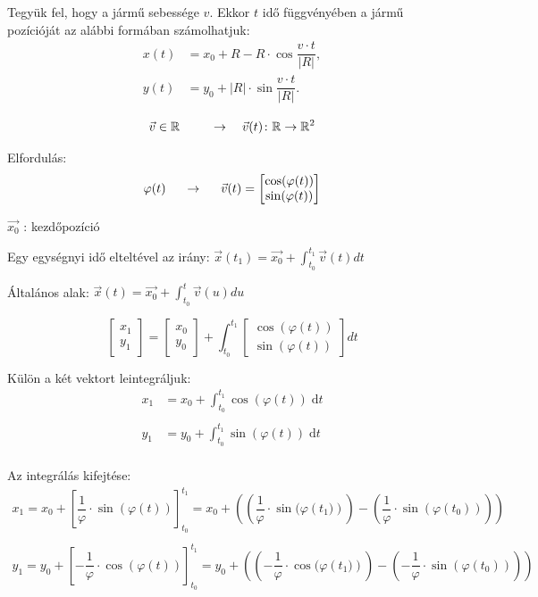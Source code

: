Tegyük fel, hogy a jármű sebessége $v$. Ekkor $t$ idő függvényében a jármű pozícióját az alábbi formában számolhatjuk:
\begin{align*}
x(t) &= x_0 + R - R \cdot \cos \dfrac{v \cdot t}{|R|}, \\
y(t) &= y_0 + |R| \cdot \sin \dfrac{v \cdot t}{|R|}.
\end{align*}


$$
\vec{v} \in \mathbb{R} \hspace{0.5cm}
\quad \rightarrow \quad
\vec{v} (t) \colon \mathbb{R} \to \mathbb{R}^2
$$

Elfordulás:
$$
\varphi (t) \hspace{0.5cm} \rightarrow \hspace{0.5cm} \vec{v} (t) =
\begin{bmatrix}
\cos(\varphi(t)) \\
\sin(\varphi(t))
\end{bmatrix}
$$

$ \vec{x_0} $ : kezdőpozíció

Egy egységnyi idő elteltével az irány: $ \vec{x} (t_1) = \vec{x_0} + \displaystyle\int_{t_0}^{t_1} \vec{v} (t) dt $

Általános alak:  $ \vec{x} (t) = \vec{x_0} + \displaystyle\int_{t_0}^{t} \vec{v} (u) du $

$$
\begin{bmatrix} x_1 \\ y_1 \end{bmatrix} = \begin{bmatrix} x_0 \\ y_0 \end{bmatrix} + \displaystyle\int_{t_0}^{t_1} \begin{bmatrix} \cos(\varphi(t)) \\ \sin(\varphi(t)) \end{bmatrix} dt 
$$


Külön a két vektort leintegráljuk:
\begin{align*}
x_1 &= x_0 + \displaystyle\int_{t_0}^{t_1} \cos(\varphi(t)) \; \mathrm{d}t \\ \\
y_1 &= y_0 + \displaystyle\int_{t_0}^{t_1} \sin(\varphi(t)) \; \mathrm{d}t \\
\end{align*}

Az integrálás kifejtése:
\begin{align*}
x_1 = x_0 + \left[\dfrac{1}{\varphi} \cdot \sin(\varphi(t))\right]_{t_0}^{t_1} = x_0 + \left(\left(\dfrac{1}{\varphi} \cdot \sin(\varphi({t_1)})\right) - \left(\dfrac{1}{\varphi} \cdot \sin(\varphi({t_0}))\right)\right)  \\ \\
y_1 = y_0 + \left[- \dfrac{1}{\varphi} \cdot \cos(\varphi(t))\right]_{t_0}^{t_1} = y_0 + \left(\left(- \dfrac{1}{\varphi} \cdot \cos(\varphi({t_1)})\right) - \left(- \dfrac{1}{\varphi} \cdot \sin(\varphi({t_0}))\right)\right) \\
\end{align*}

